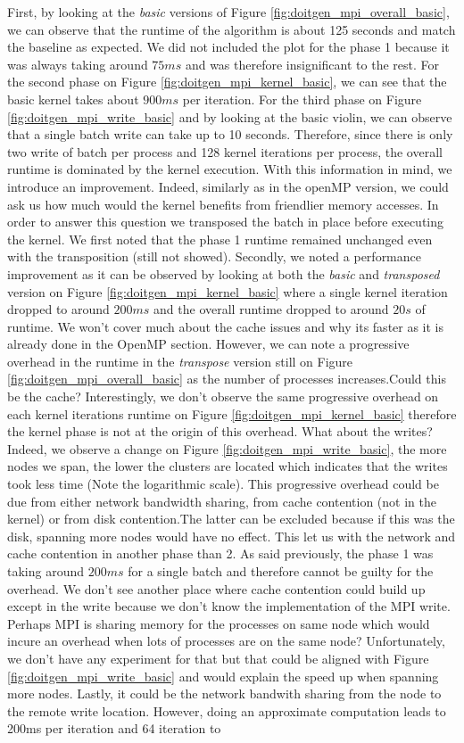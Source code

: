 First, by looking at the \textit{basic} versions of Figure \ref{fig:doitgen_mpi_overall_basic}, we can observe that the runtime of the algorithm is about 125 seconds and match the baseline as expected. We did not included the plot for the phase 1 because it was always taking around $75 ms$ and was therefore insignificant to the rest. For the second phase on Figure \ref{fig:doitgen_mpi_kernel_basic}, we can see that the basic kernel takes about $900 ms$ per iteration. For the third phase on Figure \ref{fig:doitgen_mpi_write_basic} and by looking at the basic violin, we can observe that a single batch write can take up to 10 seconds. Therefore, since there is only two write of batch per process and 128 kernel iterations per process, the overall runtime is dominated by the kernel execution. With this information in mind, we introduce an improvement. Indeed, similarly as in the openMP version, we could ask us how much would the kernel benefits from friendlier memory accesses. In order to answer this question we transposed the batch in place before executing the kernel. We first noted that the phase 1 runtime remained unchanged even with the transposition (still not showed). Secondly, we noted a performance improvement as it can be observed by looking at both the \textit{basic} and \textit{transposed} version on Figure \ref{fig:doitgen_mpi_kernel_basic} where a single kernel iteration dropped to around $200 ms$ and the overall runtime dropped to around $20s$ of runtime. We won't cover much about the cache issues and why its faster as it is already done in the OpenMP section. However, we can note a progressive overhead in the runtime in the \textit{transpose} version still on Figure \ref{fig:doitgen_mpi_overall_basic} as the number of processes increases.Could this be the cache? Interestingly, we don't observe the same progressive overhead on each kernel iterations runtime on Figure \ref{fig:doitgen_mpi_kernel_basic} therefore the kernel phase is not at the origin of this overhead. What about the writes? Indeed, we observe a change on Figure \ref{fig:doitgen_mpi_write_basic}, the more nodes we span, the lower the clusters are located which indicates that the writes took less time (Note the logarithmic scale). This progressive overhead could be due from either network bandwidth sharing, from cache contention (not in the kernel) or from disk contention.The latter can be excluded because if this was the disk, spanning more nodes would have no effect. This let us with the network and cache contention in another phase than 2. As said previously, the phase 1 was taking around $200ms$ for a single batch and therefore cannot be guilty for the overhead. We don't see another place where cache contention could build up except in the write because we don't know the implementation of the MPI write. Perhaps MPI is sharing memory for the processes on same node which would incure an overhead when lots of processes are on the same node? Unfortunately, we don't have any experiment for that but that could be aligned with Figure \ref{fig:doitgen_mpi_write_basic} and would explain the speed up when spanning more nodes. Lastly, it could be the network bandwith sharing from the node to the remote write location. However, doing an approximate computation leads to 200ms per iteration and 64 iteration to 